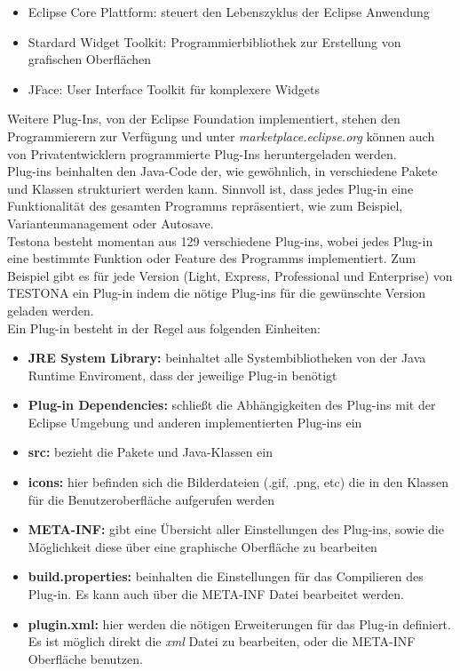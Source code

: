 \begin{itemize}
\item Eclipse Core Plattform: steuert den Lebenszyklus der Eclipse Anwendung
\item Stardard Widget Toolkit: Programmierbibliothek zur Erstellung von grafischen Oberflächen
\item JFace: User Interface Toolkit für komplexere Widgets
\end{itemize}

Weitere Plug-Ins, von der Eclipse Foundation implementiert, stehen den Programmierern zur Verfügung und unter \textit{marketplace.eclipse.org} können auch von Privatentwicklern programmierte Plug-Ins heruntergeladen werden. \cite{Eclipse}\\

Plug-ins beinhalten den Java-Code der, wie gewöhnlich, in verschiedene Pakete und Klassen strukturiert werden kann. Sinnvoll ist, dass jedes Plug-in eine Funktionalität des gesamten Programms repräsentiert, wie zum Beispiel, Variantenmanagement oder Autosave.\\

Testona besteht momentan aus 129 verschiedene Plug-ins, wobei jedes Plug-in eine bestimmte Funktion oder Feature des Programms implementiert. Zum Beispiel gibt es für jede Version (Light, Express, Professional und Enterprise) von TESTONA ein Plug-in indem die nötige Plug-ins für die gewünschte Version geladen werden.\\

Ein Plug-in besteht in der Regel aus folgenden Einheiten:

\begin{itemize}
\item \textbf{JRE System Library:} beinhaltet alle Systembibliotheken von der Java Runtime Enviroment, dass der jeweilige Plug-in benötigt
\item \textbf{Plug-in Dependencies:} schließt die Abhängigkeiten des Plug-ins mit der Eclipse Umgebung und anderen implementierten Plug-ins ein
\item \textbf{src:} bezieht die Pakete und Java-Klassen ein
\item \textbf{icons:} hier befinden sich die Bilderdateien (.gif, .png, etc) die in den Klassen für die Benutzeroberfläche  aufgerufen werden
\item \textbf{META-INF:} gibt eine Übersicht aller Einstellungen des Plug-ins, sowie die Möglichkeit diese über eine graphische Oberfläche zu bearbeiten
\item \textbf{build.properties:} beinhalten die Einstellungen für das Compilieren des Plug-in. Es kann auch über die META-INF Datei bearbeitet werden.
\item \textbf{plugin.xml:} hier werden die nötigen Erweiterungen für das Plug-in definiert. Es ist möglich direkt die \textit{xml} Datei zu bearbeiten, oder die META-INF Oberfläche benutzen.
\end{itemize}

